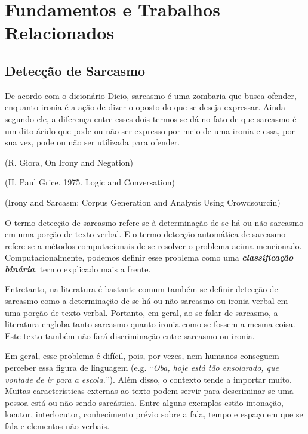 

\chapter{Fundamentos e Trabalhos Relacionados}%
\label{cha:fundamentos_e_trabalhos_relacionados}

\section{Detecção de Sarcasmo}%
\label{sec:deteccao_de_sarcasmo}

De acordo com o dicionário Dicio, sarcasmo é uma zombaria que busca ofender,
enquanto ironia é a ação de dizer o oposto do que se deseja expressar. Ainda
segundo ele, a diferença entre esses dois termos se dá no fato de que sarcasmo é
um dito ácido que pode ou não ser expresso por meio de uma ironia e essa, por
sua vez, pode ou não ser utilizada para
ofender.~\cite{dicio_sarc, dicio_irony}

\cite{sarcasm:survey}

(R. Giora, On Irony and Negation)

(H. Paul Grice. 1975. Logic and Conversation)

(Irony and Sarcasm: Corpus Generation and Analysis Using Crowdsourcin)

O termo detecção de sarcasmo refere-se à determinação de se há ou não sarcasmo
em uma porção de texto verbal. E o termo detecção automática de sarcasmo
refere-se a métodos computacionais de se resolver o problema acima mencionado.
Computacionalmente, podemos definir esse problema como uma
\textit{\textbf{classificação binária}}, termo explicado mais a frente.

Entretanto, na literatura é bastante comum também se definir detecção de
sarcasmo como a determinação de se há ou não sarcasmo ou ironia verbal em uma
porção de texto verbal. Portanto, em geral, ao se falar de sarcasmo, a
literatura engloba tanto sarcasmo quanto ironia como se fossem a mesma coisa.
Este texto também não fará discriminação entre sarcasmo ou ironia.

Em geral, esse problema é difícil, pois, por vezes, nem humanos conseguem
perceber essa figura de linguagem (e.g. ``\textit{Oba, hoje está tão ensolarado,
que vontade de ir para a escola.}''). Além disso, o contexto tende a importar
muito. Muitas características externas ao texto podem servir para descriminar se
uma pessoa está ou não sendo sarcástica. Entre alguns exemplos estão intonação,
locutor, interlocutor, conhecimento prévio sobre a fala, tempo e espaço em que
se fala e elementos não verbais.~\cite{wallace-etal:2014:ironic-context}

